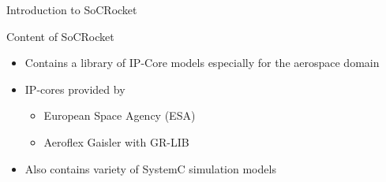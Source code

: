 \begin{frame}{Introduction to SoCRocket}
\begin{block}{Content of SoCRocket}
  \begin{itemize}
		\item Contains a library of IP-Core models especially for the aerospace domain
		\item IP-cores provided by 
			\begin{itemize}
				\item European Space Agency (ESA)
				\item Aeroflex Gaisler with GR-LIB
			\end{itemize}
		\item Also contains variety of SystemC simulation models
	\end{itemize}
\end{block}
\end{frame}
